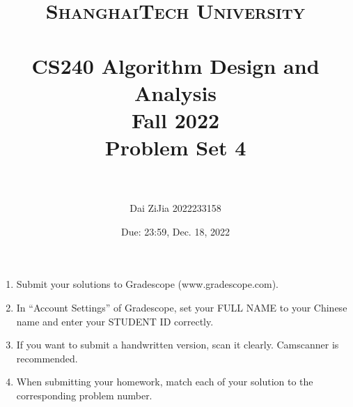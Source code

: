 \documentclass{article}
\title{
    \normalfont \normalsize
    \textsc{ShanghaiTech University} \\ [25pt]
    \horrule{0.5pt} \\[0.4cm] %
    \huge CS240 Algorithm Design and Analysis \\ %
    \LARGE Fall 2022\\
    \LARGE Problem Set 4\\
    \horrule{2pt} \\[0.5cm] %
}
\author{Dai ZiJia 2022233158}
\date{Due: 23:59, Dec. 18, 2022}
\begin{document}
\maketitle
\vspace{3ex}

\begin{enumerate}
\item Submit your solutions to Gradescope (www.gradescope.com).
\item In ``Account Settings'' of Gradescope, set your FULL NAME to your Chinese name and enter your STUDENT ID correctly. 
\item If you want to submit a handwritten version, scan it clearly. Camscanner is recommended. 
\item When submitting your homework, match each of your solution to the corresponding problem number. 
\end{enumerate}

\newpage


\newpage


\newpage


\newpage


\newpage

\end{document}

